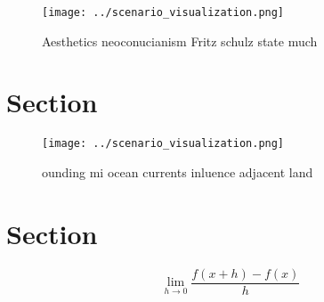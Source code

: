 \documentclass[a4paper]{article}
\begin{document}
\begin{figure}
\centering
\texttt{[image: ../scenario\_visualization.png]}
\caption{Aesthetics neoconucianism Fritz schulz state much
}
\end{figure}
 
\section{Section}

\begin{figure}
\centering
\texttt{[image: ../scenario\_visualization.png]}
\caption{ ounding mi ocean currents inluence adjacent land
}
\end{figure}
 
\section{Section}

\[\lim_{h \rightarrow 0 } \frac{f(x+h)-f(x)}{h}\]
\end{document}
